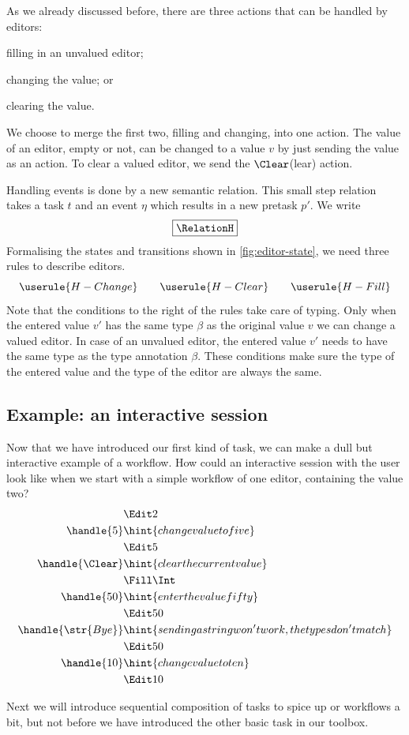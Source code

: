 As we already discussed before,
there are three actions that can be handled by editors:
\begin{enumerate*}
  \item filling in an unvalued editor;
  \item changing the value; or
  \item clearing the value.
\end{enumerate*}
We choose to merge the first two, filling and changing, into one action.
The value of an editor, empty or not, can be changed to a value $v$ by just sending the value as an action.
To clear a valued editor, we send the $\Clear$(lear) action.

Handling events is done by a new semantic relation.
This small step relation takes a task $t$ and an event $\eta$ which results in a new pretask $p'$.
We write
\begin{equation*}
  \boxed{\RelationH}
\end{equation*}
Formalising the states and transitions shown in \autoref{fig:editor-state},
we need three rules to describe editors.
\begin{equation*}
  \userule{H-Change} \qquad \userule{H-Clear} \qquad \userule{H-Fill}
\end{equation*}
Note that the conditions to the right of the rules take care of typing.
Only when the entered value $v'$ has the same type $\beta$ as the original value $v$ we can change a valued editor.
In case of an unvalued editor,
the entered value $v'$ needs to have the same type as the type annotation $\beta$.
These conditions make sure the type of the entered value and the type of the editor are always the same.


\subsection{Example: an interactive session}

Now that we have introduced our first kind of task,
we can make a dull but interactive example of a workflow.
How could an interactive session with the user look like when we start with a simple workflow of one editor,
containing the value two?
\begin{align*}
    & \Edit 2 \\
  \handle{5} & \hint{change value to five} \\
    & \Edit 5 \\
  \handle{\Clear} & \hint{clear the current value} \\
    & \Fill \Int \\
  \handle{50} & \hint{enter the value fifty} \\
    & \Edit 50 \\
  \handle{\str{Bye}} & \hint{sending a string won't work, the types don't match} \\
    & \Edit 50 \\
  \handle{10} & \hint{change value to ten} \\
    & \Edit 10
\end{align*}

Next we will introduce sequential composition of tasks to spice up or workflows a bit,
but not before we have introduced the other basic task in our toolbox.

